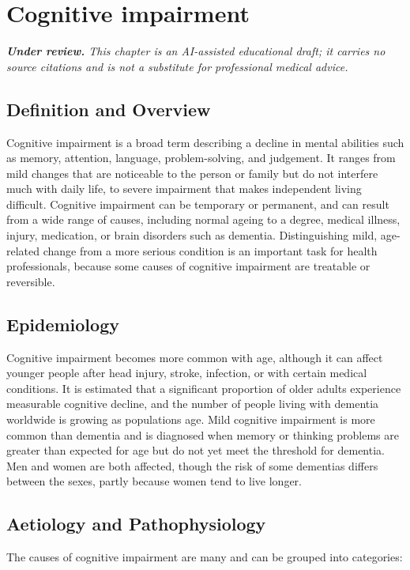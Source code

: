 \chapter{Cognitive impairment}

\medskip
\noindent\textit{\textbf{Under review.} This chapter is an AI-assisted educational draft; it carries no source citations and is not a substitute for professional medical advice.}

\section*{Definition and Overview}
Cognitive impairment is a broad term describing a decline in mental abilities such as memory, attention, language, problem-solving, and judgement. It ranges from mild changes that are noticeable to the person or family but do not interfere much with daily life, to severe impairment that makes independent living difficult. Cognitive impairment can be temporary or permanent, and can result from a wide range of causes, including normal ageing to a degree, medical illness, injury, medication, or brain disorders such as dementia. Distinguishing mild, age-related change from a more serious condition is an important task for health professionals, because some causes of cognitive impairment are treatable or reversible.

\section*{Epidemiology}
Cognitive impairment becomes more common with age, although it can affect younger people after head injury, stroke, infection, or with certain medical conditions. It is estimated that a significant proportion of older adults experience measurable cognitive decline, and the number of people living with dementia worldwide is growing as populations age. Mild cognitive impairment is more common than dementia and is diagnosed when memory or thinking problems are greater than expected for age but do not yet meet the threshold for dementia. Men and women are both affected, though the risk of some dementias differs between the sexes, partly because women tend to live longer.

\section*{Aetiology and Pathophysiology}
The causes of cognitive impairment are many and can be grouped into categories:


